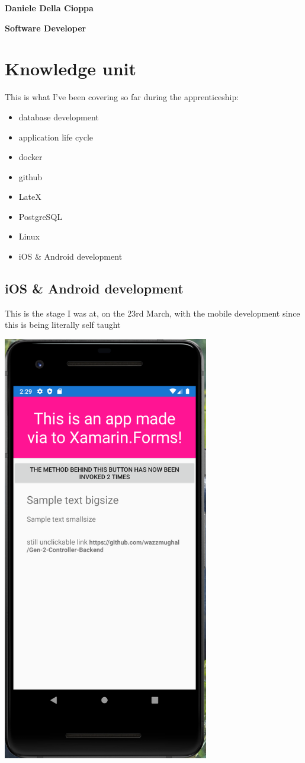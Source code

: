 \documentclass[a4paper,12pt]{article}
\begin{document}
\textbf{Daniele Della Cioppa}

\textbf{Software Developer}

\tableofcontents
\clearpage

\section{Knowledge unit}

This is what I've been covering so far during the apprenticeship:

\begin{itemize}
\item {database development}
\item {application life cycle}
\item docker
\item github 
\item LateX
\item PostgreSQL
\item Linux
\item {iOS & Android development}
\end{itemize}
\clearpage

\subsection{iOS & Android development}
This is the stage I was at, on the 23rd March, with the mobile development since this is being literally self taught

\includegraphics[width=9cm]{./capture-app.PNG}
\end{document}
